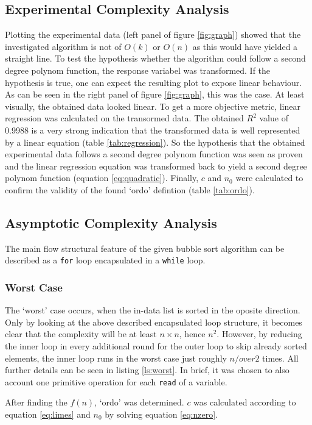 \documentclass[a4paper,11pt,twoside]{article}
\begin{document}
\subsection{Experimental Complexity Analysis}
Plotting the experimental data (left panel of figure \ref{fig:graph}) showed that
the investigated algorithm is not of $O(k)$ or $O(n)$ as this would
have yielded a straight line. To test the hypothesis whether the
algorithm could follow a second degree polynom function, the response
variabel was transformed. If the hypothesis is true, one can expect
the resulting plot to expose linear behaviour. As can be seen in the
right panel of figure \ref{fig:graph}, this was the case. At least
visually, the obtained data looked linear. To get a more objective
metric, linear regression was calculated on the transormed data. The
obtained $R^2$ value of 0.9988 is a very strong indication that the
transformed data is well represented by a linear equation 
(table \ref{tab:regression}). So the hypothesis that the obtained
experimental data follows a second degree polynom function was
seen as proven and the linear regression equation was transformed back
to yield a second degree polynom function (equation
\ref{eq:quadratic}). Finally, $c$ and $n_{0}$ were calculated to confirm
the validity of the found `ordo' defintion (table \ref{tab:ordo}). 


\subsection{Asymptotic Complexity Analysis}
The main flow structural feature of the given bubble sort algorithm can be
described as a \verb!for! loop encapsulated in a \verb!while!
loop. 

\subsubsection{Worst Case}
The `worst' case occurs, when the in-data list is sorted in the
oposite direction. Only by looking at the above described encapsulated
loop structure, it becomes clear that the complexity will be at least
$n \times n$, hence $n^2$. However, by reducing the inner loop in
every additional round for the outer loop to skip already sorted
elements, the inner loop runs in the worst case just roughly ${n /over
  2}$ times. All further details can be seen in listing
\ref{ls:worst}. In brief, it was chosen to also account one primitive
operation for each \verb!read! of a variable.

After finding the $f(n)$, `ordo' was determined. $c$ was calculated
according to equation \ref{eq:limes} and $n_{0}$ by solving equation
\ref{eq:nzero}. 
\end{document}
